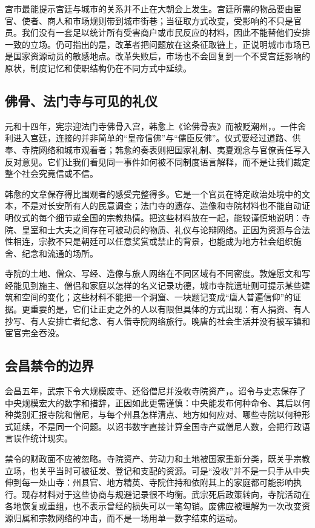 宫市最能提示宫廷与城市的关系并不止在大朝会上发生。宫廷所需的物品要由宦官、使者、商人和市场规则带到城市街巷；当征取方式改变，受影响的不只是官员。我们没有一套足以统计所有受害商户或市民反应的材料，因此不能替他们安排一致的立场。仍可指出的是，改革者把问题放在这条征取链上，正说明城市市场已是国家资源动员的敏感地点。改革失败后，市场也不会回复到一个不受宫廷影响的原状，制度记忆和使职结构仍在不同方式中延续。

\subsection{佛骨、法门寺与可见的礼仪}
元和十四年，宪宗迎法门寺佛骨入宫，韩愈上《论佛骨表》而被贬潮州，。一件舍利进入宫廷，连接的并非简单的“皇帝信佛”与“儒臣反佛”。仪式要经过道路、供奉、寺院网络和城市观看者；韩愈的奏表则把国家礼制、夷夏观念与官僚责任写入反对意见。它们让我们看见同一事件如何被不同制度语言解释，而不是让我们裁定整个社会究竟信或不信。

韩愈的文章保存得比围观者的感受完整得多。它是一个官员在特定政治处境中的文本，不是对长安所有人的民意调查；法门寺的遗存、造像和寺院材料也不能自动证明仪式的每个细节或全国的宗教热情。把这些材料放在一起，能较谨慎地说明：寺院、皇室和士大夫之间存在可被动员的物质、礼仪与论辩网络。正因为资源与合法性相连，宗教不只是朝廷可以任意奖赏或禁止的背景，也能成为地方社会组织施舍、纪念和流通的场所。

寺院的土地、僧众、写经、造像与旅人网络在不同区域有不同密度。敦煌愿文和写经能见到施主、僧侣和家庭以怎样的名义记录功德，城市寺院遗址则可提示某些建筑和空间的变化；这些材料不能把一个洞窟、一块题记变成“唐人普遍信仰”的证据。更重要的是，它们让正史之外的人以有限但具体的方式出现：有人捐资、有人抄写、有人安排亡者纪念、有人借寺院网络旅行。晚唐的社会生活并没有被军镇和宦官完全吞没。

\subsection{会昌禁令的边界}
会昌五年，武宗下令大规模废寺、还俗僧尼并没收寺院资产，。诏令与史志保存了中央规模宏大的数字和措辞，正因如此更需谨慎：中央能发布何种命令、其后以何种类别汇报寺院和僧尼，与每个州县怎样清点、地方如何应对、哪些寺院以何种形式延续，不是同一个问题。以诏书数字直接计算全国寺产或僧尼人数，会把行政语言误作统计现实。

禁令的财政面不应被忽略。寺院资产、劳动力和土地被国家重新分类，既关乎宗教立场，也关乎当时可被征发、登记和支配的资源。可是“没收”并不是一只手从中央伸到每一处山寺：州县官、地方精英、寺院住持和依附其上的家庭都可能影响执行。现存材料对于这些协商与规避记录很不均衡。武宗死后政策转向，寺院活动在各地恢复或重组，也不表示曾经的损失可以一笔勾销。废佛应被理解为一次改变资源归属和宗教网络的冲击，而不是一场用单一数字结束的运动。

